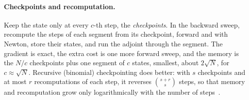 \paragraph{Checkpoints and recomputation.}
Keep the state only at every $c$-th step, the \emph{checkpoints}. In the backward
sweep, recompute the steps of each segment from its checkpoint, forward and with
Newton, store their states, and run the adjoint through the segment. The gradient
is exact, the extra cost is one more forward sweep, and the memory is the
$N/c$ checkpoints plus one segment of $c$ states, smallest, about $2\sqrt N$,
for $c\approx\sqrt N$. Recursive (binomial) checkpointing does better: with $s$
checkpoints and at most $r$ recomputations of each step, it reverses
$\binom{s+r}{s}$ steps, so that memory and recomputation grow only
logarithmically with the number of steps~\cite{GriewankWalther2008}.

